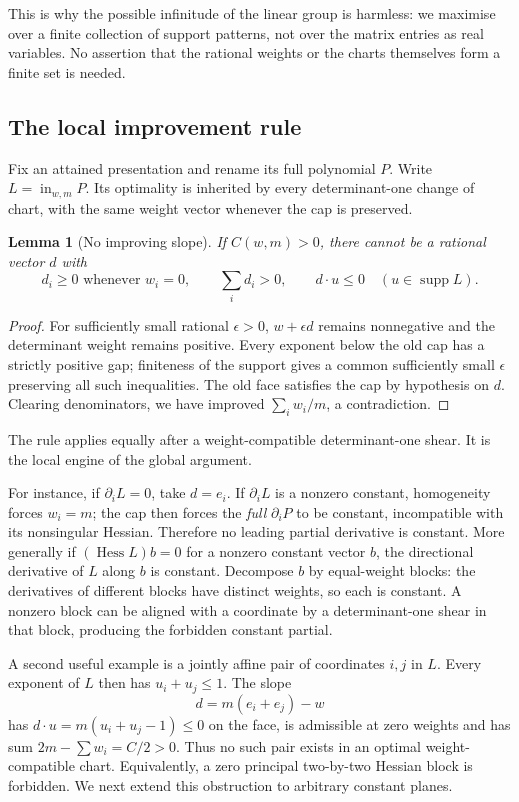 \documentclass[11pt,a4paper]{article}
\newtheorem{lemma}[theorem]{Lemma}
\newcommand{\Hess}{\operatorname{Hess}}
\newcommand{\supp}{\operatorname{supp}}
\newcommand{\inw}{\operatorname{in}}
\begin{document}
This is why the possible infinitude of the linear group is harmless: we maximise over a finite collection of support patterns, not over the matrix entries as real variables. No assertion that the rational weights or the charts themselves form a finite set is needed.

\subsection{The local improvement rule}\label{sec:improve}
Fix an attained presentation and rename its full polynomial $P$. Write $L=\inw_{w,m}P$. Its optimality is inherited by every determinant-one change of chart, with the same weight vector whenever the cap is preserved.

\begin{lemma}[No improving slope]\label{lem:slope}
If $C(w,m)>0$, there cannot be a rational vector $d$ with
\[
 d_i\ge0\text{ whenever }w_i=0,\qquad
 \sum_i d_i>0,\qquad d\cdot u\le0\quad(u\in\supp L).
\]
\end{lemma}
\begin{proof}
For sufficiently small rational $\epsilon>0$, $w+\epsilon d$ remains nonnegative and the determinant weight remains positive. Every exponent below the old cap has a strictly positive gap; finiteness of the support gives a common sufficiently small $\epsilon$ preserving all such inequalities. The old face satisfies the cap by hypothesis on $d$. Clearing denominators, we have improved $\sum_i w_i/m$, a contradiction.
\end{proof}
The rule applies equally after a weight-compatible determinant-one shear. It is the local engine of the global argument.

For instance, if $\partial_i L=0$, take $d=e_i$. If $\partial_i L$ is a nonzero constant, homogeneity forces $w_i=m$; the cap then forces the \emph{full} $\partial_i P$ to be constant, incompatible with its nonsingular Hessian. Therefore no leading partial derivative is constant. More generally if $(\Hess L)b=0$ for a nonzero constant vector $b$, the directional derivative of $L$ along $b$ is constant. Decompose $b$ by equal-weight blocks: the derivatives of different blocks have distinct weights, so each is constant. A nonzero block can be aligned with a coordinate by a determinant-one shear in that block, producing the forbidden constant partial.

A second useful example is a jointly affine pair of coordinates $i,j$ in $L$. Every exponent of $L$ then has $u_i+u_j\le1$. The slope
\[
 d=m(e_i+e_j)-w
\]
has $d\cdot u=m(u_i+u_j-1)\le0$ on the face, is admissible at zero weights and has sum $2m-\sum w_i=C/2>0$. Thus no such pair exists in an optimal weight-compatible chart. Equivalently, a zero principal two-by-two Hessian block is forbidden. We next extend this obstruction to arbitrary constant planes.
\end{document}
